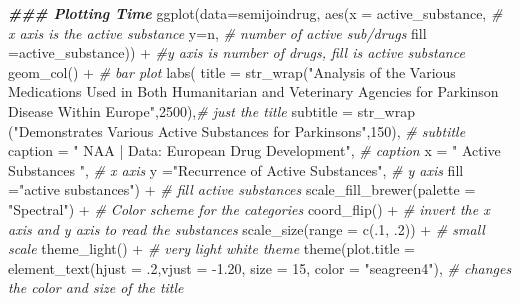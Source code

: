 \documentclass[
]{article}
\newenvironment{Shaded}{\begin{snugshade}}{\end{snugshade}}
\newcommand{\AttributeTok}[1]{\textcolor[rgb]{0.77,0.63,0.00}{#1}}
\newcommand{\CommentTok}[1]{\textcolor[rgb]{0.56,0.35,0.01}{\textit{#1}}}
\newcommand{\DecValTok}[1]{\textcolor[rgb]{0.00,0.00,0.81}{#1}}
\newcommand{\DocumentationTok}[1]{\textcolor[rgb]{0.56,0.35,0.01}{\textbf{\textit{#1}}}}
\newcommand{\FloatTok}[1]{\textcolor[rgb]{0.00,0.00,0.81}{#1}}
\newcommand{\FunctionTok}[1]{\textcolor[rgb]{0.00,0.00,0.00}{#1}}
\newcommand{\NormalTok}[1]{#1}
\newcommand{\SpecialCharTok}[1]{\textcolor[rgb]{0.00,0.00,0.00}{#1}}
\newcommand{\StringTok}[1]{\textcolor[rgb]{0.31,0.60,0.02}{#1}}
\begin{document}
\begin{Shaded}
\begin{Highlighting}[]
\DocumentationTok{\#\#\# Plotting Time}
  \FunctionTok{ggplot}\NormalTok{(}\AttributeTok{data=}\NormalTok{semijoindrug,}
    \FunctionTok{aes}\NormalTok{(}\AttributeTok{x =}\NormalTok{ active\_substance,     }\CommentTok{\# x axis is the active substance}
        \AttributeTok{y=}\NormalTok{n,  }\CommentTok{\# number of active sub/drugs}
        \AttributeTok{fill =}\NormalTok{active\_substance)) }\SpecialCharTok{+}  \CommentTok{\#y axis is number of drugs, fill is active substance}
  \FunctionTok{geom\_col}\NormalTok{() }\SpecialCharTok{+}  \CommentTok{\# bar plot}
  \FunctionTok{labs}\NormalTok{(}
    \AttributeTok{title =} \FunctionTok{str\_wrap}\NormalTok{(}\StringTok{"Analysis of the Various Medications Used in Both Humanitarian and Veterinary Agencies for Parkinson Disease Within Europe"}\NormalTok{,}\DecValTok{2500}\NormalTok{),}\CommentTok{\# just the title}
    \AttributeTok{subtitle =} \FunctionTok{str\_wrap}\NormalTok{ (}\StringTok{"Demonstrates Various Active Substances for Parkinsons"}\NormalTok{,}\DecValTok{150}\NormalTok{),   }\CommentTok{\# subtitle}
    \AttributeTok{caption =} \StringTok{" NAA | Data: European Drug Development"}\NormalTok{, }\CommentTok{\# caption}
    \AttributeTok{x =} \StringTok{" Active Substances "}\NormalTok{, }\CommentTok{\# x axis}
    \AttributeTok{y =}\StringTok{"Recurrence of Active Substances"}\NormalTok{, }\CommentTok{\# y axis}
    \AttributeTok{fill =}\StringTok{"active substances"}\NormalTok{) }\SpecialCharTok{+} \CommentTok{\# fill active substances}
  \FunctionTok{scale\_fill\_brewer}\NormalTok{(}\AttributeTok{palette =} \StringTok{"Spectral"}\NormalTok{) }\SpecialCharTok{+}   \CommentTok{\# Color scheme for the categories}
  \FunctionTok{coord\_flip}\NormalTok{() }\SpecialCharTok{+} \CommentTok{\# invert the x axis and y axis to read the substances}
  \FunctionTok{scale\_size}\NormalTok{(}\AttributeTok{range =} \FunctionTok{c}\NormalTok{(.}\DecValTok{1}\NormalTok{, .}\DecValTok{2}\NormalTok{)) }\SpecialCharTok{+} \CommentTok{\# small scale}
  \FunctionTok{theme\_light}\NormalTok{() }\SpecialCharTok{+} \CommentTok{\# very light white theme}
  \FunctionTok{theme}\NormalTok{(}\AttributeTok{plot.title =} \FunctionTok{element\_text}\NormalTok{(}\AttributeTok{hjust =}\NormalTok{ .}\DecValTok{2}\NormalTok{,}\AttributeTok{vjust =} \SpecialCharTok{{-}}\FloatTok{1.20}\NormalTok{, }\AttributeTok{size =} \DecValTok{15}\NormalTok{, }\AttributeTok{color =} \StringTok{"seagreen4"}\NormalTok{), }\CommentTok{\# changes the color and size of the title}

\end{Highlighting}
\end{Shaded}
\end{document}
